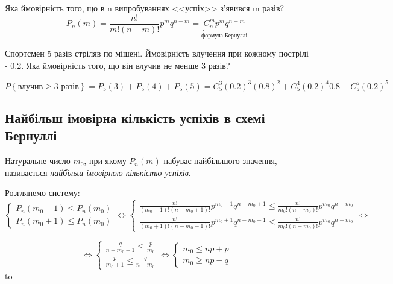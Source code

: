 Яка ймовірність того, що в n випробуваннях <<успіх>> з'явився m разів?
\begin{equation}
    P_n(m) = \frac{n!}{m!(n-m)!}p^mq^{n-m} = 
    \underbracket{C_n^m p^m q^{n-m}}_{\text{формула Бернуллі}}
\end{equation}

\begin{example}\label{ex:sportsman}
    Спортсмен 5 разів стріляв по мішені. Ймовірність влучення при кожному пострілі - 0.2. 
    Яка ймовірність того, що він влучив не менше 3 разів?

    $P\left\{\text{влучив} \geq  \text{3 разів} \right\} = P_5(3) + P_5(4) + P_5(5) = 
    C_5^3 (0.2)^3 (0.8)^2 + C_5^4 (0.2)^4 0.8 + C_5^5 (0.2)^5$
\end{example}
\subsection{Найбільш імовірна кількість успіхів в схемі Бернуллі}
\begin{definition}
    Натуральне число $m_0$, при якому $P_n(m)$ набуває найбільшого значення, 
    називається \emph{найбільш імовірною кількістю успіхів}.
\end{definition}

Розглянемо систему:
$$\begin{cases}
    P_n(m_0 - 1) \leq P_n(m_0)\\
    P_n(m_0 + 1) \leq P_n(m_0)
\end{cases}
\Leftrightarrow 
\begin{cases}
    \frac{n!}{(m_0 - 1)!(n-m_0+1)!} p^{m_0 - 1} q^{n - m_0 + 1} 
    \leq 
    \frac{n!}{m_0!(n-m_0)!} p^{m_0} q^{n - m_0}\\
    \frac{n!}{(m_0 + 1)!(n-m_0-1)!} p^{m_0 + 1} q^{n - m_0 - 1} 
    \leq 
    \frac{n!}{m_0!(n-m_0)!} p^{m_0} q^{n - m_0}
\end{cases}
\Leftrightarrow
$$

$$
\Leftrightarrow
\begin{cases}
    \frac{q}{n-m_0+1} \leq \frac{p}{m_0} \\
    \frac{p}{m_0 + 1} \leq \frac{q}{n-m_0}
\end{cases}
\Leftrightarrow
\begin{cases}
    m_0 \leq np+p\\
    m_0 \geq np-q
\end{cases}
$$
\hbox to 

